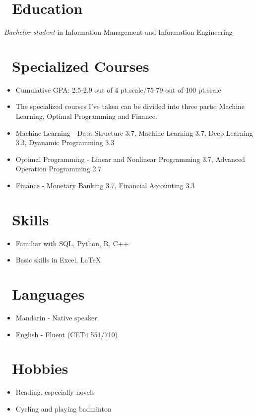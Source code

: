 \documentclass{resume}
\begin{document}



\section{\faGraduationCap\ Education}
\textit{Bachelor student} in Information Management and Information Engineering

\section{\faUsers\ Specialized Courses}
\begin{itemize}[parsep=0.5ex]
  \item Cumulative GPA: 2.5-2.9 out of 4 pt.scale/75-79 out of 100 pt.scale
  \item The specialized courses I've taken can be divided into three parts: Machine Learning, Optimal Programming and Finance.
  \item Machine Learning - Data Structure 3.7, Machine Learning 3.7, Deep Learning 3.3, Dyanamic Programming 3.3
  \item Optimal Programming - Linear and Nonlinear Programming 3.7, Advanced Operation Programming 2.7
  \item Finance - Monetary Banking 3.7, Financial Accounting 3.3
\end{itemize}
  
\section{\faCogs\ Skills}
\begin{itemize}[parsep=0.5ex]
  \item Familiar with SQL, Python, R, C++
  \item Basic skills in Excel, LaTeX
\end{itemize}

\section{\faInfo\ Languages}
\begin{itemize}[parsep=0.5ex]
  \item Mandarin - Native speaker
  \item English - Fluent (CET4 551/710)
\end{itemize}

\section{\faHeartO\ Hobbies}
\begin{itemize}[parsep=0.5ex]
  \item Reading, especially novels
  \item Cycling and playing badminton
\end{itemize}
%
%
\end{document}
